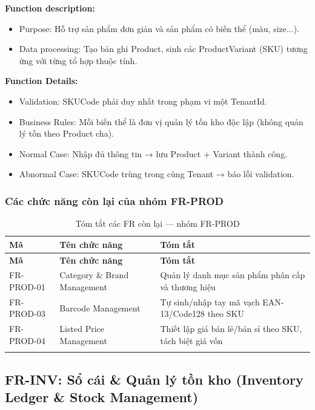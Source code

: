 \textbf{Function description:}
\begin{itemize}
    \item Purpose: Hỗ trợ sản phẩm đơn giản và sản phẩm có biến thể (màu, size...).
    \item Data processing: Tạo bản ghi Product, sinh các ProductVariant (SKU) tương ứng với từng tổ hợp thuộc tính.
\end{itemize}

\textbf{Function Details:}
\begin{itemize}
    \item Validation: SKUCode phải duy nhất trong phạm vi một TenantId.
    \item Business Rules: Mỗi biến thể là đơn vị quản lý tồn kho độc lập (không quản lý tồn theo Product cha).
    \item Normal Case: Nhập đủ thông tin → lưu Product + Variant thành công.
    \item Abnormal Case: SKUCode trùng trong cùng Tenant → báo lỗi validation.
\end{itemize}

\subsubsection{Các chức năng còn lại của nhóm FR-PROD}

\begin{longtable}{|p{2cm}|p{4.5cm}|p{7cm}|}
    \hline
    \textbf{Mã} & \textbf{Tên chức năng} & \textbf{Tóm tắt} \\
    \hline
    \endfirsthead
    \hline
    \textbf{Mã} & \textbf{Tên chức năng} & \textbf{Tóm tắt} \\
    \hline
    \endhead
    FR-PROD-01 & Category \& Brand Management & Quản lý danh mục sản phẩm phân cấp và thương hiệu \\
    \hline
    FR-PROD-03 & Barcode Management & Tự sinh/nhập tay mã vạch EAN-13/Code128 theo SKU \\
    \hline
    FR-PROD-04 & Listed Price Management & Thiết lập giá bán lẻ/bán sỉ theo SKU, tách biệt giá vốn \\
    \hline
    \caption{Tóm tắt các FR còn lại — nhóm FR-PROD}
\end{longtable}

\subsection{FR-INV: Sổ cái \& Quản lý tồn kho (Inventory Ledger \& Stock Management)}

